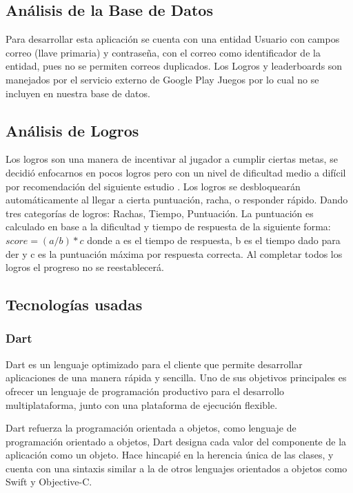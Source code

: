 \documentclass{article}
\begin{document}
\subsection{Análisis de la Base de Datos}%
Para desarrollar esta aplicación se cuenta con una entidad Usuario con campos correo (llave primaria) y contraseña, con el correo como identificador de la entidad, pues no se permiten correos duplicados. Los Logros y leaderboards son manejados por el servicio externo de Google Play Juegos por lo cual no se incluyen en nuestra base de datos.

\subsection{Análisis de Logros}
Los logros son una manera de incentivar al jugador a cumplir ciertas metas, se decidió enfocarnos en pocos logros pero con un nivel de dificultad medio a difícil por recomendación del siguiente estudio \cite{groening2019achievement}.
Los logros se desbloquearán automáticamente al llegar a cierta puntuación, racha, o  responder rápido. Dando tres categorías de logros: Rachas, Tiempo, Puntuación. La puntuación es calculado en base a la dificultad y tiempo de respuesta de la siguiente forma: \(score = (a/b ) * c\) donde a es el tiempo de respuesta, b es el tiempo dado para 
der y c es la puntuación máxima por respuesta correcta.   Al completar todos los logros el progreso no se reestablecerá. 


\subsection{Tecnologías usadas}
\subsubsection{Dart}
Dart es un lenguaje optimizado para el cliente que permite desarrollar 
aplicaciones de una manera rápida y sencilla. Uno de sus objetivos principales es 
ofrecer un lenguaje de programación productivo para el desarrollo multiplataforma, 
junto con una plataforma de ejecución flexible.

Dart refuerza la programación orientada a objetos, como lenguaje de programación 
orientado a objetos, Dart designa cada valor del componente de la aplicación como 
un objeto. Hace hincapié en la herencia única de las clases, y cuenta con una sintaxis 
similar a la de otros lenguajes orientados a objetos como Swift y Objective-C.
\end{document}
